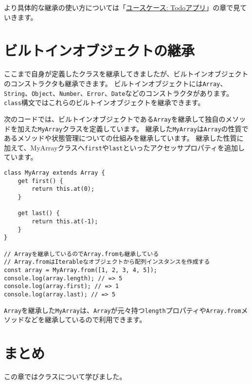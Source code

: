 より具体的な継承の使い方については「\hyperlink{todo-app}{ユースケース: Todoアプリ}」の章で見ていきます。

\hypertarget{extends-built-in}{%
\section{ビルトインオブジェクトの継承}\label{extends-built-in}}

ここまで自身が定義したクラスを継承してきましたが、ビルトインオブジェクトのコンストラクタも継承できます。
ビルトインオブジェクトには\texttt{Array}、\texttt{String}、\texttt{Object}、\texttt{Number}、\texttt{Error}、\texttt{Date}などのコンストラクタがあります。
\texttt{class}構文ではこれらのビルトインオブジェクトを継承できます。

次のコードでは、ビルトインオブジェクトである\texttt{Array}を継承して独自のメソッドを加えた\texttt{MyArray}クラスを定義しています。
継承した\texttt{MyArray}は\texttt{Array}の性質であるメソッドや状態管理についての仕組みを継承しています。
継承した性質に加えて、MyArrayクラスへ\texttt{first}や\texttt{last}といったアクセッサプロパティを追加しています。

\begin{lstlisting}
class MyArray extends Array {
    get first() {
        return this.at(0);
    }

    get last() {
        return this.at(-1);
    }
}

// Arrayを継承しているのでArray.fromも継承している
// Array.fromはIterableなオブジェクトから配列インスタンスを作成する
const array = MyArray.from([1, 2, 3, 4, 5]);
console.log(array.length); // => 5
console.log(array.first); // => 1
console.log(array.last); // => 5
\end{lstlisting}

\texttt{Array}を継承した\texttt{MyArray}は、\texttt{Array}が元々持つ\texttt{length}プロパティや\texttt{Array.from}メソッドなどを継承しているので利用できます。

\hypertarget{conclusion}{%
\section{まとめ}\label{conclusion}}

この章ではクラスについて学びました。

